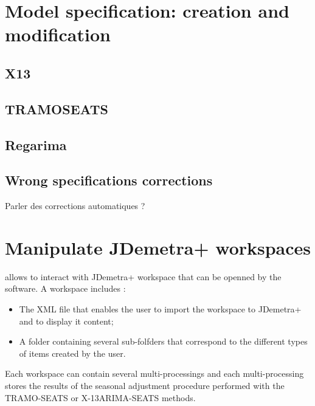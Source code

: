 \documentclass[article]{jss}
\providecommand{\tightlist}{%
  \setlength{\itemsep}{0pt}\setlength{\parskip}{0pt}}
\begin{document}
\hypertarget{user-def-spec}{%
\section{Model specification: creation and
modification}\label{user-def-spec}}

\hypertarget{x13}{%
\subsection{X13}\label{x13}}

\hypertarget{tramoseats}{%
\subsection{TRAMOSEATS}\label{tramoseats}}

\hypertarget{regarima-1}{%
\subsection{Regarima}\label{regarima-1}}

\hypertarget{wrong-specifications-corrections}{%
\subsection{Wrong specifications
corrections}\label{wrong-specifications-corrections}}

Parler des corrections automatiques ?

\hypertarget{manipulate-workspace}{%
\section{Manipulate JDemetra+ workspaces}\label{manipulate-workspace}}

 allows to interact with JDemetra+ workspace that can be
openned by the software. A workspace includes :

\begin{itemize}
\tightlist
\item
  The XML file that enables the user to import the workspace to
  JDemetra+ and to display it content;\\
\item
  A folder containing several sub-folfders that correspond to the
  different types of items created by the user.
\end{itemize}

Each workspace can contain several multi-processings and each
multi-processing stores the results of the seasonal adjustment procedure
performed with the TRAMO-SEATS or X-13ARIMA-SEATS methods.
\end{document}
